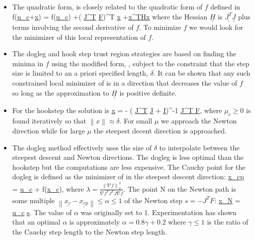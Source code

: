 \begin{itemize} 
 \item  The quadratic form,  is closely related to the quadratic
 form of $f$ defined in 
 \beq \label{nl30}
  f(\underline{u_c}+\underline{x}) = f(\underline{u_c}) +\left (
  \underline{\underline{J^T}} \underline{ F}\right )^T 
  \underline{x}
  +\underline{x^T}\underline{\underline{H}}\underline{x}
 \eeq
 where the Hessian $\underline{\underline{H}}$ is
 $\underline{\underline{J^T}}\underline{\underline{J}} $ plus terms involving
 the second derivative of $f$. To minimize $f$ we would look for the minimizer
 of this local representation of $f$. \item The dogleg and hook step trust
 region strategies are based on finding the minima in $f$ using the modified
 form, , subject to the constraint that the step size is limited to
 an a priori specified length, $\delta$. It can be shown that any such
 constrained local minimizer of  is in a direction that  decreases
 the value of $f$ so long as the approximation to $\underline{\underline{H}}$ is
 positive definite.
 \item For the hookstep the solution is 
 \beq \label{nl35}
  \underline{x} = - \left (
  \underline{\underline{J^T}} \underline{ J} + \mu
  \underline{\underline{I}}\right )^{-1}
  \underline{\underline{J^T}}\underline{ F},
 \eeq
 where $\mu_c \ge 0 $ is found iteratively so that 
 $\left \| x  \right \| \approx  \delta $. For small $\mu $ we approach the
 Newton direction while for large $ \mu $ the steepest decent direction  is
 approached.
\end{itemize}

\begin{itemize} 
 \item The dogleg method effectively  uses the  size of $\delta $ to
 interpolate between the steepest descent and Newton
 directions. The dogleg is less optimal than the hookstep
 but the computations are less expensive. The Cauchy point
 for the dogleg is defined as the minimizer of 
 in the steepest descent direction:
 \beq \label{nl40}
  \underline{x_{cp}} = \underline{u_c} + \lambda \nabla f(\underline{x_c}),
 \eeq
 where $\lambda = \frac{\left\|\nabla f\right\|_2^2}{\nabla f^T J^T J\nabla f}$.
 The point N on the Newton path is some multiple 
 $\left\|\underline{x_c}-\underline{x_{cp}} \right\| \le \alpha \le 1 $ of the Newton step
 $ s = -J^T F $:
 \beq
  \underline{x_{N}} = \underline{u_c} \alpha \underline{s}.
 \eeq
 The value of $\alpha$ was originally set to 1. Experimentation has shown that
 an optimal $\alpha$ is approximately $ \alpha = 0.8\gamma +0.2 $ where 
 $\gamma \le 1 $ is the ratio of the Cauchy  step length to the Newton step
 length.
\end{itemize}

